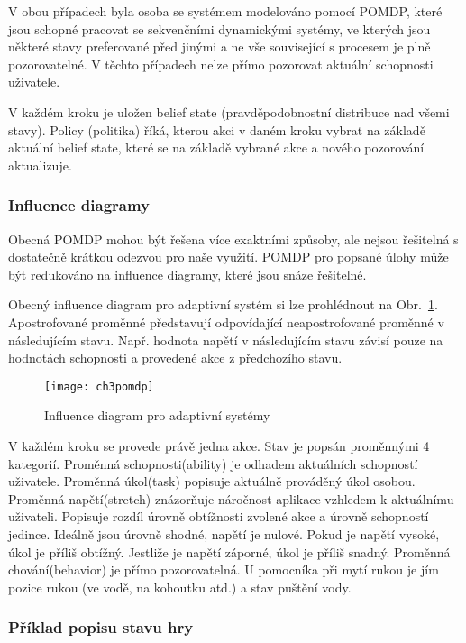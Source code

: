 V obou případech byla osoba se systémem modelováno pomocí POMDP, které jsou schopné pracovat se sekvenčními dynamickými systémy, ve kterých jsou některé stavy preferované před jinými a ne vše související s procesem je plně pozorovatelné. V těchto případech nelze přímo pozorovat aktuální schopnosti uživatele.

V každém kroku je uložen belief state (pravděpodobnostní distribuce nad všemi stavy). Policy (politika) říká, kterou akci v daném kroku vybrat na základě aktuální belief state, které se na základě vybrané akce a nového pozorování aktualizuje.

\subsubsection{Influence diagramy}

Obecná POMDP mohou být řešena více exaktními způsoby, ale nejsou řešitelná s dostatečně krátkou odezvou pro naše využití. POMDP pro popsané úlohy může být redukováno na influence diagramy, které jsou snáze řešitelné.
 
Obecný influence diagram pro adaptivní systém si lze prohlédnout na Obr.~\ref{fig:ch3pomdp}. Apostrofované proměnné představují odpovídající neapostrofované proměnné v následujícím stavu. Např. hodnota napětí v následujícím stavu závisí pouze na hodnotách schopnosti a provedené akce z předchozího stavu.

\begin{figure}
  \centering
  \texttt{[image: ch3pomdp]}
	\caption{Influence diagram pro adaptivní systémy}
	\label{fig:ch3pomdp}
\end{figure}

V každém kroku se provede právě jedna akce. Stav je popsán proměnnými 4 kategorií. Proměnná schopnosti(ability) je odhadem aktuálních schopností uživatele. Proměnná úkol(task) popisuje aktuálně prováděný úkol osobou. Proměnná napětí(stretch) znázorňuje náročnost aplikace vzhledem k aktuálnímu uživateli. Popisuje rozdíl úrovně obtížnosti zvolené akce a úrovně schopností jedince. Ideálně jsou úrovně shodné, napětí je nulové. Pokud je napětí vysoké, úkol je příliš obtížný. Jestliže je napětí záporné, úkol je příliš snadný. Proměnná chování(behavior) je přímo pozorovatelná. U pomocníka při mytí rukou je jím pozice rukou (ve vodě, na kohoutku atd.) a stav puštění vody.

\subsubsection{Příklad popisu stavu hry}

